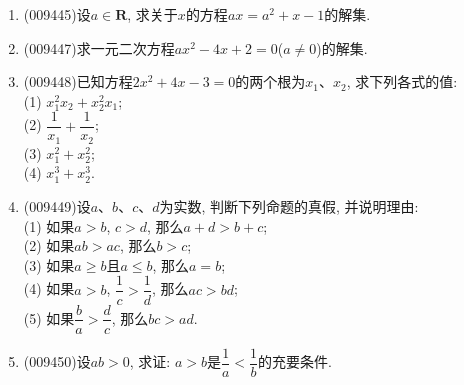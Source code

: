 \documentclass[10pt,a4paper]{article}
\begin{document}
\begin{enumerate}[1.]
\item {\tiny (009445)}设$a\in \mathbf{R}$, 求关于$x$的方程$ax=a^2+x-1$的解集.
\item {\tiny (009447)}求一元二次方程$ax^2-4x+2=0$($a\ne 0$)的解集.
\item {\tiny (009448)}已知方程$2x^2+4x-3=0$的两个根为$x_1$、$x_2$, 求下列各式的值:\\
(1) $x_1^2x_2+x_2^2x_1$;\\
(2) $\dfrac1{x_1}+\dfrac1{x_2}$;\\
(3) $x_1^2+x_2^2$;\\
(4) $x_1^3+x_2^3$.
\item {\tiny (009449)}设$a$、$b$、$c$、$d$为实数, 判断下列命题的真假, 并说明理由:\\
(1) 如果$a>b$, $c>d$, 那么$a+d>b+c$;\\
(2) 如果$ab>ac$, 那么$b>c$;\\
(3) 如果$a\ge b$且$a\le b$, 那么$a=b$;\\
(4) 如果$a>b$, $\dfrac 1c>\dfrac 1d$, 那么$ac>bd$;\\
(5) 如果$\dfrac ba>\dfrac dc$, 那么$bc>ad$.
\item {\tiny (009450)}设$ab>0$, 求证: $a>b$是$\dfrac 1a<\dfrac 1b$的充要条件.
\end{enumerate}
\end{document}
